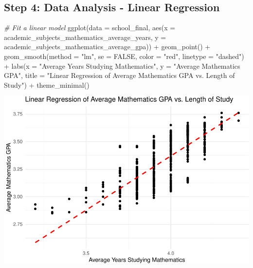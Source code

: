 \documentclass[
]{book}
\newenvironment{Shaded}{\begin{snugshade}}{\end{snugshade}}
\newcommand{\AttributeTok}[1]{\textcolor[rgb]{0.77,0.63,0.00}{#1}}
\newcommand{\CommentTok}[1]{\textcolor[rgb]{0.56,0.35,0.01}{\textit{#1}}}
\newcommand{\ConstantTok}[1]{\textcolor[rgb]{0.00,0.00,0.00}{#1}}
\newcommand{\FunctionTok}[1]{\textcolor[rgb]{0.00,0.00,0.00}{#1}}
\newcommand{\NormalTok}[1]{#1}
\newcommand{\SpecialCharTok}[1]{\textcolor[rgb]{0.00,0.00,0.00}{#1}}
\newcommand{\StringTok}[1]{\textcolor[rgb]{0.31,0.60,0.02}{#1}}
\begin{document}
\hypertarget{step-4-data-analysis---linear-regression}{%
\subsection{Step 4: Data Analysis - Linear Regression}\label{step-4-data-analysis---linear-regression}}

\begin{Shaded}
\begin{Highlighting}[]
\CommentTok{\# Fit a linear model}
\FunctionTok{ggplot}\NormalTok{(}\AttributeTok{data =}\NormalTok{ school\_final, }\FunctionTok{aes}\NormalTok{(}\AttributeTok{x =}\NormalTok{ academic\_subjects\_mathematics\_average\_years, }
                                \AttributeTok{y =}\NormalTok{ academic\_subjects\_mathematics\_average\_gpa)) }\SpecialCharTok{+}
  \FunctionTok{geom\_point}\NormalTok{() }\SpecialCharTok{+}
  \FunctionTok{geom\_smooth}\NormalTok{(}\AttributeTok{method =} \StringTok{"lm"}\NormalTok{, }\AttributeTok{se =} \ConstantTok{FALSE}\NormalTok{, }\AttributeTok{color =} \StringTok{"red"}\NormalTok{, }\AttributeTok{linetype =} \StringTok{"dashed"}\NormalTok{) }\SpecialCharTok{+}
  \FunctionTok{labs}\NormalTok{(}\AttributeTok{x =} \StringTok{"Average Years Studying Mathematics"}\NormalTok{, }\AttributeTok{y =} \StringTok{"Average Mathematics GPA"}\NormalTok{, }
       \AttributeTok{title =} \StringTok{"Linear Regression of Average Mathematics GPA vs. Length of Study"}\NormalTok{) }\SpecialCharTok{+}
  \FunctionTok{theme\_minimal}\NormalTok{()}
\end{Highlighting}
\end{Shaded}

\includegraphics[width=1\linewidth]{Class_Activity_25_files/figure-latex/unnamed-chunk-9-1}
\end{document}
